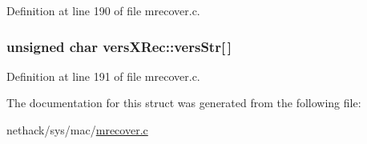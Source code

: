 Definition at line 190 of file mrecover.\+c.

\hypertarget{structversXRec_a1b00ec8928fe4c940d341a9e2aa46b50}{
\subsubsection[{vers\+Str}]{\setlength{\rightskip}{0pt plus 5cm}unsigned char vers\+X\+Rec\+::vers\+Str\mbox{[}$\,$\mbox{]}}}\label{structversXRec_a1b00ec8928fe4c940d341a9e2aa46b50}


Definition at line 191 of file mrecover.\+c.



The documentation for this struct was generated from the following file\+:\begin{DoxyCompactItemize}
\item 
nethack/sys/mac/\hyperlink{mrecover_8c}{mrecover.\+c}\end{DoxyCompactItemize}
